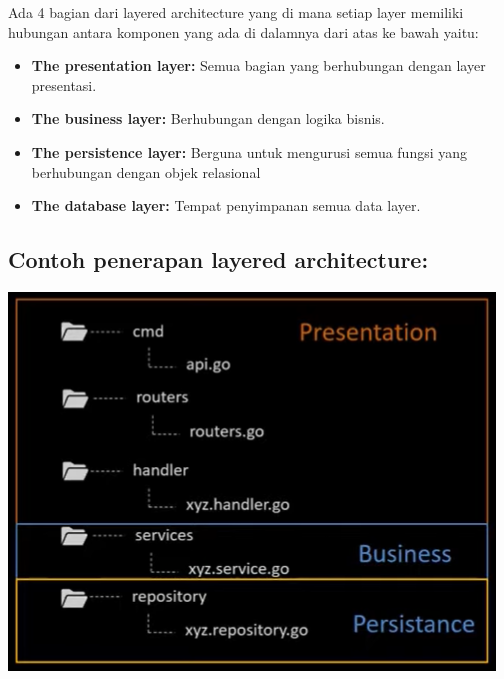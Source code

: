 Ada 4 bagian dari layered architecture yang di mana setiap layer memiliki hubungan antara komponen yang ada di dalamnya dari atas ke bawah yaitu:

\begin{itemize}
    \item \textbf{The presentation layer:} Semua bagian yang berhubungan dengan layer presentasi.
    \item \textbf{The business layer:} Berhubungan dengan logika bisnis.
    \item \textbf{The persistence layer:} Berguna untuk mengurusi semua fungsi yang berhubungan dengan objek relasional
    \item \textbf{The database layer:} Tempat penyimpanan semua data layer.
\end{itemize}

\subsection{Contoh penerapan layered architecture:}

\includegraphics[width=\textwidth]{../images/chapter05/contoh}

